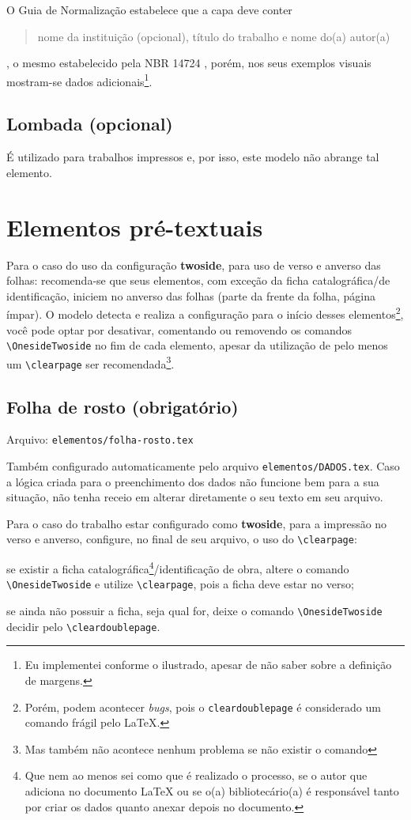     O Guia de Normalização estabelece que a capa deve conter \blockcquote[p. 30]{livro:iffar-guia-normalizacao-2022}{nome da instituição (opcional), título do trabalho e nome do(a) autor(a)}, o mesmo estabelecido pela NBR 14724 \cite{livro:abnt-nbr-14724:2011}, porém, nos seus exemplos visuais mostram-se dados adicionais\footnote{Eu implementei conforme o ilustrado, apesar de não saber sobre a definição de margens.}.

    \subsection{Lombada (opcional)}
    É utilizado para trabalhos impressos e, por isso, este modelo não abrange tal elemento.

\section{Elementos pré-textuais}
    Para o caso do uso da configuração \textbf{twoside}, para uso de verso e anverso das folhas: recomenda-se que seus elementos, com exceção da ficha catalográfica/de identificação, iniciem no anverso das folhas (parte da frente da folha, página ímpar). O modelo detecta e realiza a configuração para o início desses elementos\footnote{Porém, podem acontecer \textit{bugs}, pois o \texttt{cleardoublepage} é considerado um comando frágil pelo \LaTeX{}.}, você pode optar por desativar, comentando ou removendo os comandos \verb|\OnesideTwoside| no fim de cada elemento, apesar da utilização de pelo menos um \verb|\clearpage| ser recomendada\footnote{Mas também não acontece nenhum problema se não existir o comando}.

\subsection{Folha de rosto (obrigatório)}
    Arquivo: \texttt{elementos/folha-rosto.tex}

    Também configurado automaticamente pelo arquivo \texttt{elementos/DADOS.tex}. Caso a lógica criada para o preenchimento dos dados não funcione bem para a sua situação, não tenha receio em alterar diretamente o seu texto em seu arquivo.

    Para o caso do trabalho estar configurado como \textbf{twoside}, para a impressão no verso e anverso, configure, no final de seu arquivo, o uso do \verb|\clearpage|:
    \begin{alinea}
        \item se existir a ficha catalográfica\footnote{Que nem ao menos sei como que é realizado o processo, se o autor que adiciona no documento \LaTeX{} ou se o(a) bibliotecário(a) é responsável tanto por criar os dados quanto anexar depois no documento.}/identificação de obra, altere o comando \verb|\OnesideTwoside| e utilize \verb|\clearpage|, pois a ficha deve estar no verso;
        \item se ainda não possuir a ficha, seja qual for, deixe o comando \verb|\OnesideTwoside| decidir pelo \verb|\cleardoublepage|.
    \end{alinea}

